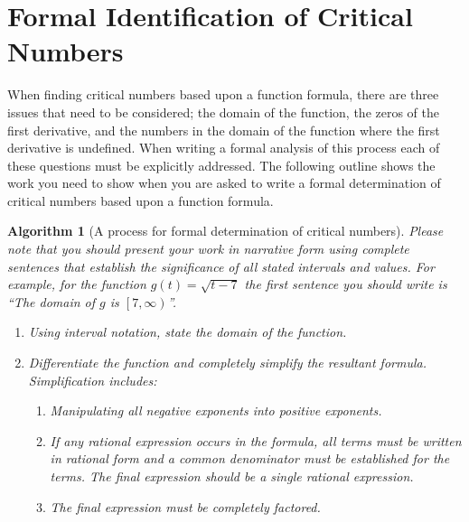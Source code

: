 \documentclass[12pt,]{book}
\theoremstyle{plain}
\newtheorem{algorithm}[theorem]{Algorithm}
\theoremstyle{definition}
\numberwithin{equation}{section}
\newcommand{\fe}[2]{#1\mathopen{}\left(#2\right)\mathclose{}}
\newcommand{\cointerval}[2]{\left[\left.#1,#2\right)\right.}
\begin{document}
\section[Formal ID of Critical Numbers]{Formal Identification of Critical Numbers}\label{section-formal-identification-of-critical-numbers}
When finding critical numbers based upon a function formula, there are three issues that need to be considered; the domain of the function, the zeros of the first derivative, and the numbers in the domain of the function where the first derivative is undefined.  When writing a formal analysis of this process each of these questions must be explicitly addressed.  The following outline shows the work you need to show when you are asked to write a formal determination of critical numbers based upon a function formula.%
\begin{algorithm}[A process for formal determination of critical numbers]\label{algorithm-find-critical-numbers}
Please note that you should present your work in narrative form using complete sentences that establish the significance of all stated intervals and values.  For example, for the function \(\fe{g}{t}=\sqrt{t-7}\) the first sentence you should write is ``The domain of \(g\) is \(\cointerval{7}{\infty}\)''.%
\begin{enumerate}
\item{}Using interval notation, state the domain of the function.\item{}Differentiate the function and completely simplify the resultant formula.  Simplification includes:
                    \begin{enumerate}
\item{}Manipulating all negative exponents into positive exponents.\item{}If any rational expression occurs in the formula, all terms must be written in rational form and a common denominator must be established for the terms.  The final expression should be a single rational expression.\item{}The final expression must be completely factored.\end{enumerate}


\end{enumerate}
\end{algorithm}
\end{document}

